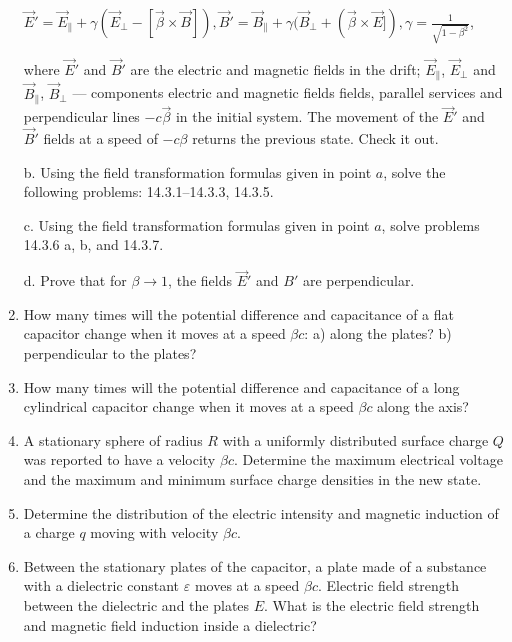 \documentclass{article}
\begin{document}
\begin{enumerate}[label=14.3.\arabic*]
$\overrightarrow{E}' = \overrightarrow{E}_{\parallel} + \gamma(\overrightarrow{E}_{\perp} - [\overrightarrow{\beta} \times \overrightarrow{B} ]), \overrightarrow{B}' = \overrightarrow{B}_{\parallel} + \gamma(\overrightarrow{B}_{\perp} + (\overrightarrow{\beta} \times \overrightarrow{E} ]), \gamma = \frac{1}{\sqrt{1 - \beta^2}}$,

where $\overrightarrow{E}'$ and $\overrightarrow{B}'$ are the electric and magnetic fields in the drift; $\overrightarrow{E}_{\parallel}$, $\overrightarrow{E}_{\perp}$ and $\overrightarrow{B}_{\parallel}$, $\overrightarrow{B}_{\perp}$ — components electric and magnetic fields fields, parallel services and perpendicular lines $- c \overrightarrow{\beta}$ in the initial system. The movement of the $\overrightarrow{E}'$ and $\overrightarrow{B}'$ fields at a speed of $- c \beta$ returns the previous state. Check it out. 

b. Using the field transformation formulas given in point $a$, solve the following problems: 14.3.1–14.3.3, 14.3.5.

c. Using the field transformation formulas given in point $a$, solve problems 14.3.6 a, b, and 14.3.7.

d. Prove that for $\beta \to 1$, the fields $\overrightarrow{E}'$ and $B'$ are perpendicular.

\item How many times will the potential difference and capacitance of a flat capacitor change when it moves at a speed $\beta c$: a) along the plates? b) perpendicular to the plates?

\item How many times will the potential difference and capacitance of a long cylindrical capacitor change when it moves at a speed $\beta c$ along the axis?

\item A stationary sphere of radius $R$ with a uniformly distributed surface charge $Q$ was reported to have a velocity $\beta c$. Determine the maximum electrical voltage and the maximum and minimum surface charge densities in the new state.

\item Determine the distribution of the electric intensity and magnetic induction of a charge $q$ moving with velocity $\beta c$.

\item Between the stationary plates of the capacitor, a plate made of a substance with a dielectric constant $\varepsilon$ moves at a speed $\beta c$. Electric field strength between the dielectric and the plates $E$. What is the electric field strength and magnetic field induction inside a dielectric?


\end{enumerate}
\end{document}
